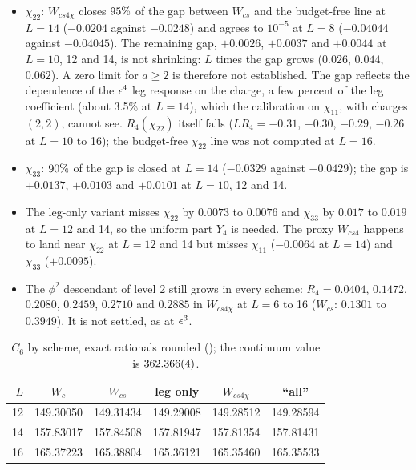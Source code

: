 \begin{itemize}
\item $\chi_{22}$: $W_{cs4\chi}$ closes $95\%$ of the gap between $W_{cs}$ and the budget-free line at $L=14$ ($-0.0204$
 against $-0.0248$) and agrees to $10^{-5}$ at $L=8$ ($-0.04044$ against $-0.04045$). The remaining gap, $+0.0026$, $+0.0037$ and $+0.0044$ at $L=10$, 12 and 14,
 is not shrinking: $L$ times the gap grows ($0.026$, $0.044$, $0.062$). A zero limit for $a\ge2$ is therefore not established.
 The gap reflects the dependence of the $\epsilon^4$ leg response on the charge, a few percent of the leg coefficient
 (about 3.5\% at $L=14$), which the calibration on $\chi_{11}$, with charges $(2,2)$, cannot see. $R_4(\chi_{22})$ itself falls ($LR_4=-0.31$, $-0.30$, $-0.29$, $-0.26$ at $L=10$ to 16); the budget-free
 $\chi_{22}$ line was not computed at $L=16$.
\item $\chi_{33}$: $90\%$ of the gap is closed at $L=14$ ($-0.0329$ against $-0.0429$); the gap is $+0.0137$, $+0.0103$
 and $+0.0101$ at $L=10$, 12 and 14.
\item The leg-only variant misses $\chi_{22}$ by $0.0073$ to $0.0076$ and $\chi_{33}$ by $0.017$ to $0.019$ at $L=12$ and 14, so the uniform
 part $Y_4$ is needed. The proxy $W_{cs4}$ happens to land near $\chi_{22}$ at $L=12$ and 14 but misses $\chi_{11}$ ($-0.0064$ at
 $L=14$) and $\chi_{33}$ ($+0.0095$).
\item The $\phi^2$ descendant of level 2 still grows in every scheme: $R_4=0.0404$, $0.1472$, $0.2080$, $0.2459$, $0.2710$ and
 $0.2885$ in $W_{cs4\chi}$ at $L=6$ to 16 ($W_{cs}$: $0.1301$ to $0.3949$). It is not settled, as at $\epsilon^3$.
\end{itemize}

\begin{table}[ht]
\centering\footnotesize\renewcommand{\arraystretch}{1.15}
\begin{tabular}{@{}rccccc@{}}
\toprule
$L$ & $W_c$ & $W_{cs}$ & leg only & $W_{cs4\chi}$ & ``all'' \\\midrule
12 & 149.30050 & 149.31434 & 149.29008 & 149.28512 & 149.28594 \\
14 & 157.83017 & 157.84508 & 157.81947 & 157.81354 & 157.81431 \\
16 & 165.37223 & 165.38804 & 165.36121 & 165.35460 & 165.35533 \\
\bottomrule
\end{tabular}
\caption{$C_6$ by scheme, exact rationals rounded (); the continuum
value is $362.366(4)$.}
\label{htp:d2:tab:c6}
\end{table}

